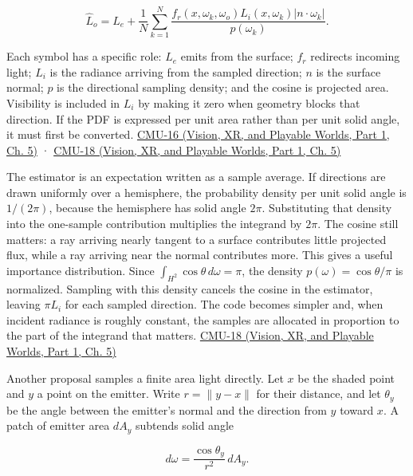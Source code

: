 \[
\widehat L_o=L_e+\frac1N\sum_{k=1}^N\frac{f_r(x,\omega_k,\omega_o)L_i(x,\omega_k)|n\cdot\omega_k|}{p(\omega_k)}.
\]

Each symbol has a specific role: \(L_e\) emits from the surface; \(f_r\) redirects incoming light; \(L_i\) is the radiance arriving from the sampled direction; \(n\) is the surface normal; \(p\) is the directional sampling density; and the cosine is projected area. Visibility is included in \(L_i\) by making it zero when geometry blocks that direction. If the PDF is expressed per unit area rather than per unit solid angle, it must first be converted. \href{../07-Vision-XR-and-Playable-Worlds-P01/main.pdf\#nameddest=04-visual-computing-ii-ch036-cmu-16---the-rendering-equation}{CMU-16 (Vision, XR, and Playable Worlds, Part 1, Ch. 5)} · \href{../07-Vision-XR-and-Playable-Worlds-P01/main.pdf\#nameddest=04-visual-computing-ii-ch036-cmu-18---monte-carlo-rendering}{CMU-18 (Vision, XR, and Playable Worlds, Part 1, Ch. 5)}

The estimator is an expectation written as a sample average. If directions are drawn uniformly over a hemisphere, the probability density per unit solid angle is \(1/(2\pi)\), because the hemisphere has solid angle \(2\pi\). Substituting that density into the one-sample contribution multiplies the integrand by \(2\pi\). The cosine still matters: a ray arriving nearly tangent to a surface contributes little projected flux, while a ray arriving near the normal contributes more. This gives a useful importance distribution. Since \(\int_{H^2}\cos\theta\,d\omega=\pi\), the density \(p(\omega)=\cos\theta/\pi\) is normalized. Sampling with this density cancels the cosine in the estimator, leaving \(\pi L_i\) for each sampled direction. The code becomes simpler and, when incident radiance is roughly constant, the samples are allocated in proportion to the part of the integrand that matters. \href{../07-Vision-XR-and-Playable-Worlds-P01/main.pdf\#nameddest=04-visual-computing-ii-ch036-cmu-18---monte-carlo-rendering}{CMU-18 (Vision, XR, and Playable Worlds, Part 1, Ch. 5)}

Another proposal samples a finite area light directly. Let \(x\) be the shaded point and \(y\) a point on the emitter. Write \(r=\|y-x\|\) for their distance, and let \(\theta_y\) be the angle between the emitter's normal and the direction from \(y\) toward \(x\). A patch of emitter area \(dA_y\) subtends solid angle

\[
d\omega = \frac{\cos\theta_y}{r^2}\,dA_y.
\]


